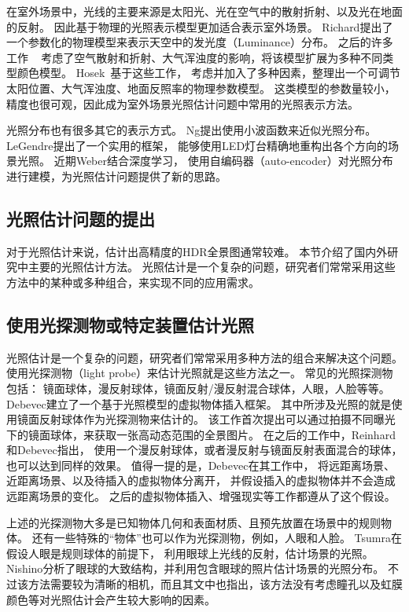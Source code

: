 在室外场景中，光线的主要来源是太阳光、光在空气中的散射折射、以及光在地面的反射。
因此基于物理的光照表示模型更加适合表示室外场景。
Richard\cite{perez1993all}提出了一个参数化的物理模型来表示天空中的发光度（Luminance）分布。
之后的许多工作
~\cite{nishita1996display, sirai1993display, preetham1999practical,raab2008unbiased}
考虑了空气散射和折射、大气浑浊度的影响，将该模型扩展为多种不同类型颜色模型。
Hosek~\cite{hosek2012analytic, hovsekhovsek2013adding}基于这些工作，
考虑并加入了多种因素，整理出一个可调节太阳位置、大气浑浊度、地面反照率的物理参数模型。
这类模型的参数量较小，精度也很可观，因此成为室外场景光照估计问题中常用的光照表示方法。

光照分布也有很多其它的表示方式。
Ng\cite{ng2003all}提出使用小波函数来近似光照分布。
LeGendre\cite{legendre2016practical}提出了一个实用的框架，
能够使用LED灯台精确地重构出各个方向的场景光照。
近期Weber\cite{weber2018learning}结合深度学习，
使用自编码器（auto-encoder）对光照分布进行建模，为光照估计问题提供了新的思路。

\subsection{光照估计问题的提出}
对于光照估计来说，估计出高精度的HDR全景图通常较难。
本节介绍了国内外研究中主要的光照估计方法。
光照估计是一个复杂的问题，研究者们常常采用这些方法中的某种或多种组合，来实现不同的应用需求。

\subsection{使用光探测物或特定装置估计光照} 
光照估计是一个复杂的问题，研究者们常常采用多种方法的组合来解决这个问题。
使用光探测物（light probe）来估计光照就是这些方法之一。
常见的光照探测物包括：
镜面球体，漫反射球体，镜面反射/漫反射混合球体，人眼，人脸等等。
Debevec\cite{debevec1998rendering}建立了一个基于光照模型的虚拟物体插入框架。
其中所涉及光照的就是使用镜面反射球体作为光探测物来估计的。
该工作首次提出可以通过拍摄不同曝光下的镜面球体，来获取一张高动态范围的全景图片。
在之后的工作中，Reinhard\cite{reinhard2005high}和Debevec\cite{debevec2012single}指出，
使用一个漫反射球体，或者漫反射与镜面反射表面混合的球体，也可以达到同样的效果。 
值得一提的是，Debevec在其工作\cite{debevec1998rendering}中，
将远距离场景、近距离场景、以及待插入的虚拟物体分离开，
并假设插入的虚拟物体并不会造成远距离场景的变化。
之后的虚拟物体插入、增强现实等工作都遵从了这个假设。

上述的光探测物大多是已知物体几何和表面材质、且预先放置在场景中的规则物体。
还有一些特殊的“物体”也可以作为光探测物，例如，人眼和人脸。
Tsumra\cite{tsumura2003estimating}在假设人眼是规则球体的前提下，
利用眼球上光线的反射，估计场景的光照。
Nishino\cite{nishino2004eyes}分析了眼球的大致结构，并利用包含眼球的照片估计场景的光照分布。
不过该方法需要较为清晰的相机，而且其文中也指出，该方法没有考虑瞳孔以及虹膜颜色等对光照估计会产生较大影响的因素。

